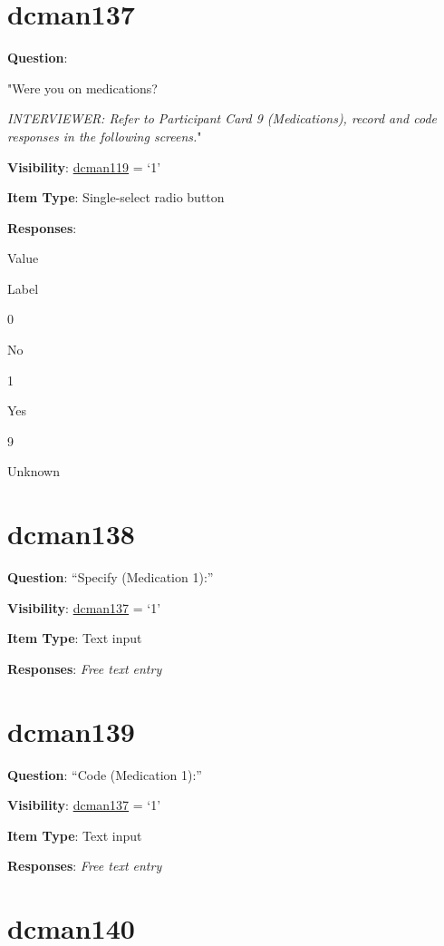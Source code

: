 \documentclass[]{book}
\begin{document}
\hypertarget{dcman137}{%
\section{dcman137}\label{dcman137}}

\textbf{Question}:

"Were you on medications?

\emph{INTERVIEWER: Refer to Participant Card 9 (Medications), record and code responses in the following screens.}"

\textbf{Visibility}: \protect\hyperlink{dcman119}{dcman119} = `1'

\textbf{Item Type}: Single-select radio button

\textbf{Responses}:

Value

Label

0

No

1

Yes

9

Unknown

\hypertarget{dcman138}{%
\section{dcman138}\label{dcman138}}

\textbf{Question}: ``Specify (Medication 1):''

\textbf{Visibility}: \protect\hyperlink{dcman137}{dcman137} = `1'

\textbf{Item Type}: Text input

\textbf{Responses}: \emph{Free text entry}

\hypertarget{dcman139}{%
\section{dcman139}\label{dcman139}}

\textbf{Question}: ``Code (Medication 1):''

\textbf{Visibility}: \protect\hyperlink{dcman137}{dcman137} = `1'

\textbf{Item Type}: Text input

\textbf{Responses}: \emph{Free text entry}

\hypertarget{dcman140}{%
\section{dcman140}\label{dcman140}}
\end{document}

